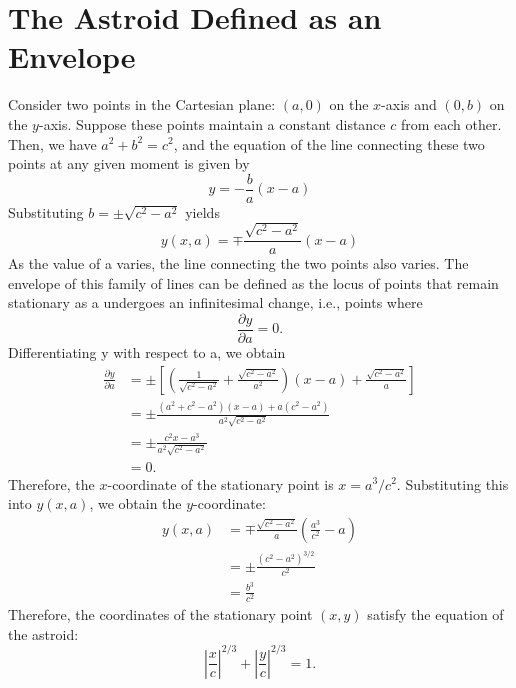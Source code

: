 \documentclass[twocolumn]{article}
\begin{document}
\section{The Astroid Defined as an Envelope} \label{app:astroid}
Consider two points in the Cartesian plane: $(a, 0)$ on the $x$-axis and $(0, b)$ on the $y$-axis. Suppose these points maintain a constant distance $c$ from each other. Then, we have $a^2 + b^2 = c^2$, and the equation of the line connecting these two points at any given moment is given by
$$y = -\frac{b}{a}(x-a)$$
Substituting $b = \pm \sqrt{c^2 - a^2}$ yields
$$y(x, a) = \mp \frac{\sqrt{c^2 - a^2}}{a}(x-a)$$
As the value of a varies, the line connecting the two points also varies. The envelope of this family of lines can be defined as the locus of points that remain stationary as a undergoes an infinitesimal change, i.e., points where
$$\frac{\partial y}{\partial a} = 0.$$
Differentiating y with respect to a, we obtain
$$
\begin{aligned}
	\frac{\partial y}{\partial a} &= \pm\left[\left( \frac{1}{\sqrt{c^2-a^2}}+\frac{\sqrt{c^2-a^2}}{a^2}\right) (x-a) + \frac{\sqrt{c^2-a^2}}{a} \right]\\
	&= \pm \frac{(a^2+c^2-a^2)(x-a)+a(c^2-a^2)}{a^2\sqrt{c^2-a^2}}\\
	&= \pm \frac{c^2 x - a^3}{a^2 \sqrt{c^2 - a^2}}\\
	&= 0.
\end{aligned}
$$
Therefore, the $x$-coordinate of the stationary point is $x = a^3/c^2$. Substituting this into $y(x, a)$, we obtain the $y$-coordinate:
$$
\begin{aligned}
	y(x, a) &= \mp \frac{\sqrt{c^2-a^2}}{a}\left(\frac{a^3}{c^2}-a\right)\\
	& = \pm \frac{\left( c^2- a^2 \right)^{3/2}}{c^2}\\
	& = \frac{b^3}{c^2}
\end{aligned}
$$
Therefore, the coordinates of the stationary point $(x, y)$ satisfy the equation of the astroid:
$$ \left|\dfrac{x}{c}\right|^{2/3} + \left|\dfrac{y}{c}\right|^{2/3} = 1. $$
\end{document}
